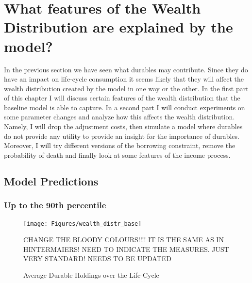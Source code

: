 \documentclass[a4paper,12pt]{article}
\begin{document}
\section{What features of the Wealth Distribution are explained by the model?}
\label{Chapter5}
In the previous section we have seen what durables may contribute. Since they do have an impact on life-cycle consumption it seems likely that they will affect the wealth distribution created by the model in one way or the other. 
In the first part of this chapter I will discuss certain features of the wealth distribution that the baseline model is able to capture. In a second part I will conduct experiments on some parameter changes and analyze how this affects the wealth distribution. Namely, I will drop the adjustment costs, then simulate a model where durables do not provide any utility to provide an insight for the importance of durables. Moreover, I will try different versions of the borrowing constraint, remove the probability of death and finally look at some features of the income process. 


\subsection{Model Predictions}

\subsubsection{Up to the 90th percentile}
\begin{figure}[!htbp]
\caption{Average Durable Holdings over the Life-Cycle} 
\label{wealth_distr_base}	%
\centering
\texttt{[image: Figures/wealth\_distr\_base]}  %

\begin{minipage}{0.8\linewidth}
\footnotesize{CHANGE THE BLOODY COLOURS!!!! IT IS THE SAME AS IN HINTERMAIERS! NEED TO INDICATE THE MEASURES. JUST VERY STANDARD! NEEDS TO BE UPDATED}
\end{minipage}

\end{figure}
\end{document}
